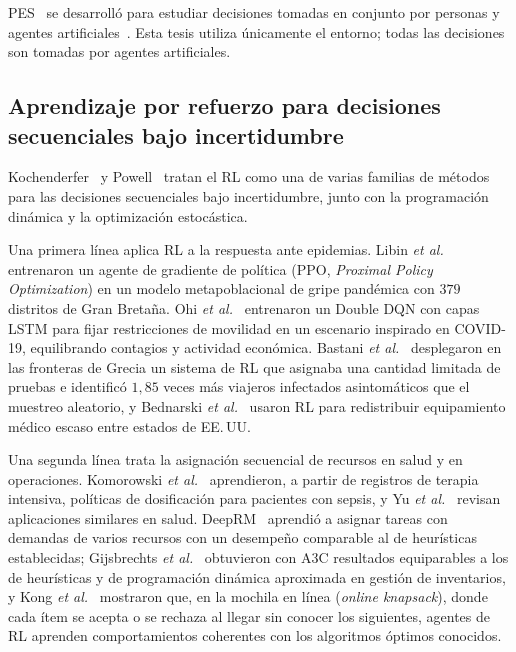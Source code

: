 \documentclass[../00_Main/Main.tex]{subfiles}
\begin{document}
\label{sec:soa}

PES~\citep{BCINE2022} se desarroll\'o para estudiar decisiones tomadas en
conjunto por personas y agentes artificiales~\citep{Nijjar2025,ds004477}.
Esta tesis utiliza \'unicamente el entorno; todas las decisiones son
tomadas por agentes artificiales.

\subsection{Aprendizaje por refuerzo para decisiones secuenciales bajo incertidumbre}\label{sec:soa-seq}

Kochenderfer~\citep{Kochenderfer2015} y Powell~\citep{Powell2022} tratan
el RL como una de varias familias de m\'etodos para las decisiones
secuenciales bajo incertidumbre, junto con la programaci\'on din\'amica y la
optimizaci\'on estoc\'astica.

Una primera l\'inea aplica RL a la respuesta ante epidemias. Libin
\emph{et al.}~\citep{Libin2021} entrenaron un agente de gradiente de
pol\'itica (PPO, \emph{Proximal Policy Optimization}) en un modelo
metapoblacional de gripe pand\'emica con $379$ distritos de Gran Breta\~na. Ohi
\emph{et al.}~\citep{Ohi2020} entrenaron un Double DQN con capas LSTM para
fijar restricciones de movilidad en un escenario inspirado en COVID-19,
equilibrando contagios y actividad econ\'omica. Bastani
\emph{et al.}~\citep{Bastani2021} desplegaron en las fronteras de Grecia un
sistema de RL que asignaba una cantidad limitada de pruebas e identific\'o
$1{,}85$ veces m\'as viajeros infectados asintom\'aticos que el muestreo
aleatorio, y Bednarski \emph{et al.}~\citep{Bednarski2021} usaron RL para
redistribuir equipamiento m\'edico escaso entre estados de EE.\,UU.

Una segunda l\'inea trata la asignaci\'on secuencial de recursos en salud y
en operaciones. Komorowski \emph{et al.}~\citep{Komorowski2018} aprendieron,
a partir de registros de terapia intensiva, pol\'iticas de dosificaci\'on
para pacientes con sepsis, y Yu \emph{et al.}~\citep{Yu2021} revisan
aplicaciones similares en salud. DeepRM~\citep{Mao2016} aprendi\'o a
asignar tareas con demandas de varios recursos con un desempe\~no
comparable al de heur\'isticas establecidas; Gijsbrechts
\emph{et al.}~\citep{Gijsbrechts2022} obtuvieron con A3C resultados
equiparables a los de heur\'isticas y de programaci\'on din\'amica aproximada en
gesti\'on de inventarios, y Kong \emph{et al.}~\citep{Kong2019} mostraron
que, en la mochila en l\'inea (\emph{online knapsack}), donde cada \'item
se acepta o se rechaza al llegar sin conocer los siguientes, agentes de RL
aprenden comportamientos coherentes con los algoritmos \'optimos conocidos.
\end{document}
